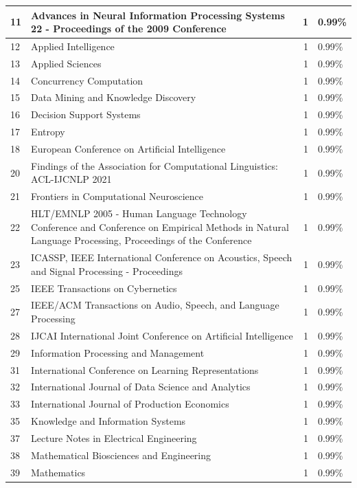 \documentclass[
]{article}
\begin{document}
\begin{table}
\begin{tabular}[t]{l|l|r|l}
\hline
11 & Advances in Neural Information Processing Systems 22 - Proceedings of the 2009 Conference & 1 & 0.99\%\\
\hline
12 & Applied Intelligence & 1 & 0.99\%\\
\hline
13 & Applied Sciences & 1 & 0.99\%\\
\hline
14 & Concurrency Computation & 1 & 0.99\%\\
\hline
15 & Data Mining and Knowledge Discovery & 1 & 0.99\%\\
\hline
16 & Decision Support Systems & 1 & 0.99\%\\
\hline
17 & Entropy & 1 & 0.99\%\\
\hline
18 & European Conference on Artificial Intelligence & 1 & 0.99\%\\
\hline
20 & Findings of the Association for Computational Linguistics: ACL-IJCNLP 2021 & 1 & 0.99\%\\
\hline
21 & Frontiers in Computational Neuroscience & 1 & 0.99\%\\
\hline
22 & HLT/EMNLP 2005 - Human Language Technology Conference and Conference on Empirical Methods in Natural Language Processing, Proceedings of the Conference & 1 & 0.99\%\\
\hline
23 & ICASSP, IEEE International Conference on Acoustics, Speech and Signal Processing - Proceedings & 1 & 0.99\%\\
\hline
25 & IEEE Transactions on Cybernetics & 1 & 0.99\%\\
\hline
27 & IEEE/ACM Transactions on Audio, Speech, and Language Processing & 1 & 0.99\%\\
\hline
28 & IJCAI International Joint Conference on Artificial Intelligence & 1 & 0.99\%\\
\hline
29 & Information Processing and Management & 1 & 0.99\%\\
\hline
31 & International Conference on Learning Representations & 1 & 0.99\%\\
\hline
32 & International Journal of Data Science and Analytics & 1 & 0.99\%\\
\hline
33 & International Journal of Production Economics & 1 & 0.99\%\\
\hline
35 & Knowledge and Information Systems & 1 & 0.99\%\\
\hline
37 & Lecture Notes in Electrical Engineering & 1 & 0.99\%\\
\hline
38 & Mathematical Biosciences and Engineering & 1 & 0.99\%\\
\hline
39 & Mathematics & 1 & 0.99\%\\

\end{tabular}
\end{table}
\end{document}
